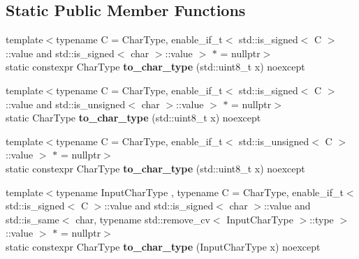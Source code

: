 \subsection*{Static Public Member Functions}
\begin{DoxyCompactItemize}
\item 
\mbox{\label{classnlohmann_1_1detail_1_1binary__writer_ab77aa48692bd4e64e4f051ce6aeb6d2d}} 
{\footnotesize template$<$typename C  = Char\+Type, enable\+\_\+if\+\_\+t$<$ std\+::is\+\_\+signed$<$ C $>$\+::value and std\+::is\+\_\+signed$<$ char $>$\+::value $>$ $\ast$  = nullptr$>$ }\\static constexpr Char\+Type {\bfseries to\+\_\+char\+\_\+type} (std\+::uint8\+\_\+t x) noexcept
\item 
\mbox{\label{classnlohmann_1_1detail_1_1binary__writer_a5e46f0dd3550901b15cf85265808d1ec}} 
{\footnotesize template$<$typename C  = Char\+Type, enable\+\_\+if\+\_\+t$<$ std\+::is\+\_\+signed$<$ C $>$\+::value and std\+::is\+\_\+unsigned$<$ char $>$\+::value $>$ $\ast$  = nullptr$>$ }\\static Char\+Type {\bfseries to\+\_\+char\+\_\+type} (std\+::uint8\+\_\+t x) noexcept
\item 
\mbox{\label{classnlohmann_1_1detail_1_1binary__writer_ab77aa48692bd4e64e4f051ce6aeb6d2d}} 
{\footnotesize template$<$typename C  = Char\+Type, enable\+\_\+if\+\_\+t$<$ std\+::is\+\_\+unsigned$<$ C $>$\+::value $>$ $\ast$  = nullptr$>$ }\\static constexpr Char\+Type {\bfseries to\+\_\+char\+\_\+type} (std\+::uint8\+\_\+t x) noexcept
\item 
\mbox{\label{classnlohmann_1_1detail_1_1binary__writer_a2c2b2132ce56b3b45593374b622baa67}} 
{\footnotesize template$<$typename Input\+Char\+Type , typename C  = Char\+Type, enable\+\_\+if\+\_\+t$<$ std\+::is\+\_\+signed$<$ C $>$\+::value and std\+::is\+\_\+signed$<$ char $>$\+::value and std\+::is\+\_\+same$<$ char, typename std\+::remove\+\_\+cv$<$ Input\+Char\+Type $>$\+::type $>$\+::value $>$ $\ast$  = nullptr$>$ }\\static constexpr Char\+Type {\bfseries to\+\_\+char\+\_\+type} (Input\+Char\+Type x) noexcept
\end{DoxyCompactItemize}
